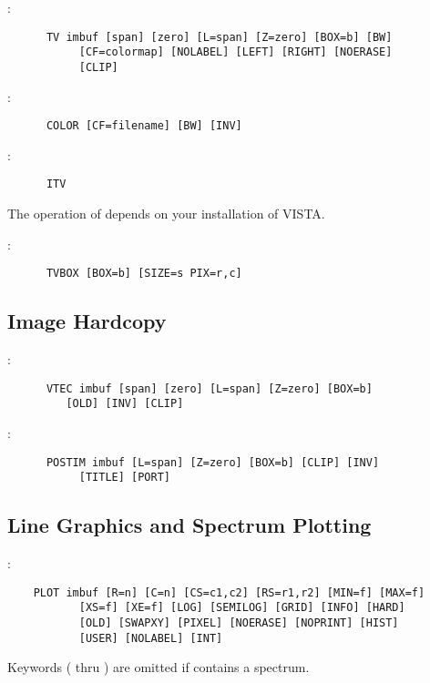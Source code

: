 :
\begin{verbatim}
      TV imbuf [span] [zero] [L=span] [Z=zero] [BOX=b] [BW]
	       [CF=colormap] [NOLABEL] [LEFT] [RIGHT] [NOERASE]
	       [CLIP]
\end{verbatim}

\noindent {}:
\begin{verbatim}
      COLOR [CF=filename] [BW] [INV]
\end{verbatim}

\noindent {}:
\begin{verbatim}
      ITV
\end{verbatim}
The operation of  depends on your installation of VISTA.

\noindent {}:
\begin{verbatim}
      TVBOX [BOX=b] [SIZE=s PIX=r,c]
\end{verbatim}

\subsection{Image Hardcopy}

:
\begin{verbatim}
      VTEC imbuf [span] [zero] [L=span] [Z=zero] [BOX=b]
		 [OLD] [INV] [CLIP]
\end{verbatim}

\noindent {}:
\begin{verbatim}
      POSTIM imbuf [L=span] [Z=zero] [BOX=b] [CLIP] [INV]
		   [TITLE] [PORT]
\end{verbatim}

\subsection{Line Graphics and Spectrum Plotting}

:
\begin{verbatim}
    PLOT imbuf [R=n] [C=n] [CS=c1,c2] [RS=r1,r2] [MIN=f] [MAX=f]
	       [XS=f] [XE=f] [LOG] [SEMILOG] [GRID] [INFO] [HARD]
	       [OLD] [SWAPXY] [PIXEL] [NOERASE] [NOPRINT] [HIST]
	       [USER] [NOLABEL] [INT]
\end{verbatim}
Keywords (\comm{[R=n]} thru \comm{[RS=r1,r2]}) are omitted if 
contains a spectrum.

